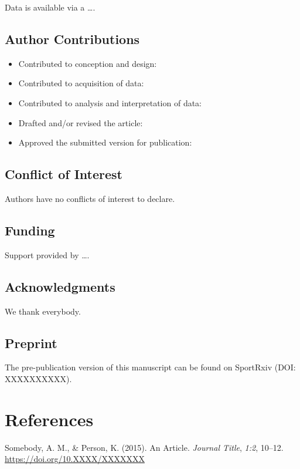 \documentclass[]{cik}%
\newlength{\cslhangindent}
\newlength{\cslentryspacingunit} %
\newenvironment{CSLReferences}[2] %
 {%
  \setlength{\parindent}{0pt}
  \ifodd #1
  \let\oldpar\par
  \def\par{\hangindent=\cslhangindent\oldpar}
  \fi
  \setlength{\parskip}{#2\cslentryspacingunit}
 }%
 {}
\begin{document}
Data is available via a \ldots.

\hypertarget{author-contributions}{%
\subsection{Author Contributions}\label{author-contributions}}

\begin{itemize}
\tightlist
\item
  Contributed to conception and design:
\item
  Contributed to acquisition of data:
\item
  Contributed to analysis and interpretation of data:
\item
  Drafted and/or revised the article:
\item
  Approved the submitted version for publication:
\end{itemize}

\hypertarget{conflict-of-interest}{%
\subsection{Conflict of Interest}\label{conflict-of-interest}}

Authors have no conflicts of interest to declare.

\hypertarget{funding}{%
\subsection{Funding}\label{funding}}

Support provided by \ldots.

\hypertarget{acknowledgments}{%
\subsection{Acknowledgments}\label{acknowledgments}}

We thank everybody.

\hypertarget{preprint}{%
\subsection{Preprint}\label{preprint}}

The pre-publication version of this manuscript can be found on SportRxiv
(DOI: XXXXXXXXXX).

\newpage

\hypertarget{references}{%
\section{References}\label{references}}

\parindent0pt 
\setlength{\parskip}{1em}

\hypertarget{refs}{}
\begin{CSLReferences}{1}{0}
\leavevmode{}%
Somebody, A. M., \& Person, K. (2015). An Article. \emph{Journal Title},
\emph{1:2}, 10--12. \url{https://doi.org/10.XXXX/XXXXXXX}

\end{CSLReferences}

%
%

%
%
%
%
\end{document}
